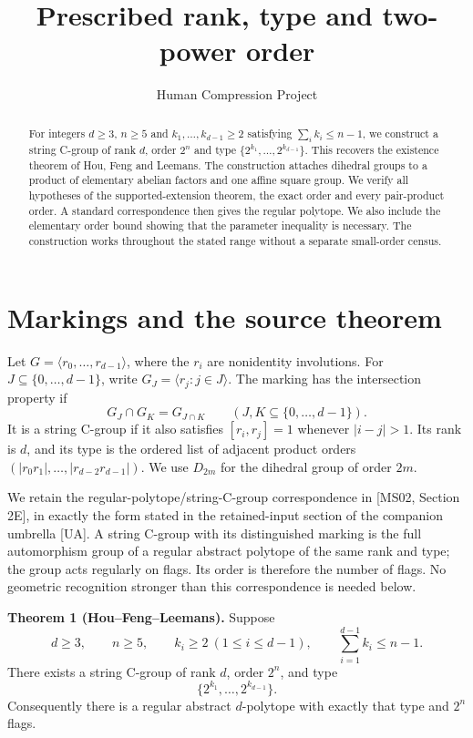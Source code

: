 
\title{Prescribed rank, type and two-power order}
\author{Human Compression Project}
\date{}

\maketitle
\begin{abstract}
For integers \(d\ge3\), \(n\ge5\) and \(k_1,\ldots,k_{d-1}\ge2\)
satisfying \(\sum_i k_i\le n-1\), we construct a string C-group of rank
\(d\), order \(2^n\) and type \(\{2^{k_1},\ldots,2^{k_{d-1}}\}\). This
recovers the existence theorem of Hou, Feng and Leemans. The
construction attaches dihedral groups to a product of elementary abelian
factors and one affine square group. We verify all hypotheses of the
supported-extension theorem, the exact order and every pair-product
order. A standard correspondence then gives the regular polytope. We
also include the elementary order bound showing that the parameter
inequality is necessary. The construction works throughout the stated
range without a separate small-order census.
\end{abstract}

\section{Markings and the source theorem}\label{markings-and-the-source-theorem}
Let \(G=\langle r_0,\ldots,r_{d-1}\rangle\), where the \(r_i\) are
nonidentity involutions. For \(J\subseteq\{0,\ldots,d-1\}\), write
\(G_J=\langle r_j:j\in J\rangle\). The marking has the intersection
property if \[
G_J\cap G_K=G_{J\cap K}\qquad(J,K\subseteq\{0,\ldots,d-1\}).
\] It is a string C-group if it also satisfies \([r_i,r_j]=1\) whenever
\(|i-j|>1\). Its rank is \(d\), and its type is the ordered list of
adjacent product orders \((|r_0r_1|,\ldots,|r_{d-2}r_{d-1}|)\). We use
\(D_{2m}\) for the dihedral group of order \(2m\).

We retain the regular-polytope/string-C-group correspondence in {[}MS02,
Section 2E{]}, in exactly the form stated in the retained-input section of the companion
umbrella {[}UA{]}. A string C-group with its distinguished marking is
the full automorphism group of a regular abstract polytope of the same
rank and type; the group acts regularly on flags. Its order is therefore
the number of flags. No geometric recognition stronger than this
correspondence is needed below.

\textbf{Theorem 1 (Hou--Feng--Leemans).} Suppose \[
d\ge3,\qquad n\ge5,\qquad k_i\ge2\ (1\le i\le d-1),\qquad
\sum_{i=1}^{d-1}k_i\le n-1.
\tag{1}
\] There exists a string C-group of rank \(d\), order \(2^n\), and type
\[
\{2^{k_1},\ldots,2^{k_{d-1}}\}.
\tag{2}
\] Consequently there is a regular abstract \(d\)-polytope with exactly
that type and \(2^n\) flags.

